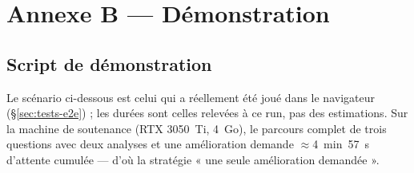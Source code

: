 \section{Annexe B --- Démonstration}
\label{sec:demo}

\subsection{Script de démonstration}

Le scénario ci-dessous est celui qui a réellement été joué dans le navigateur
(§\ref{sec:tests-e2e}) ; les durées sont celles relevées à ce run, pas des
estimations. Sur la machine de soutenance (RTX 3050~Ti, 4~Go), le parcours complet
de trois questions avec deux analyses et une amélioration demande
$\approx$4~min~57~s d'attente cumulée --- d'où la stratégie « une seule
amélioration demandée ».

